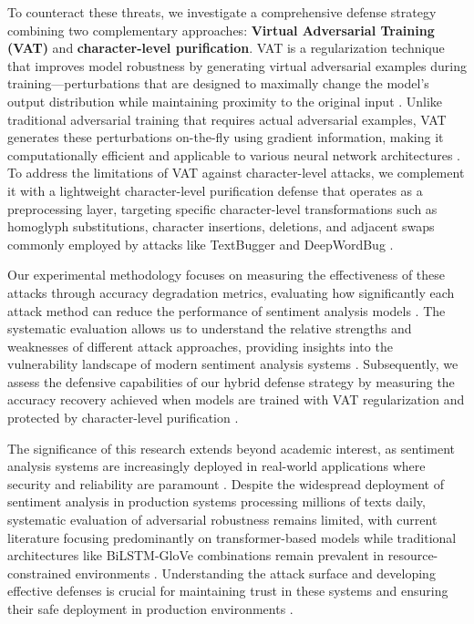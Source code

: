 \documentclass[../main.tex]{subfiles}
\begin{document}
To counteract these threats, we investigate a comprehensive defense strategy combining two complementary approaches: \textbf{Virtual Adversarial Training (VAT)} \cite{miyato2017virtual} and \textbf{character-level purification}. VAT is a regularization technique that improves model robustness by generating virtual adversarial examples during training—perturbations that are designed to maximally change the model's output distribution while maintaining proximity to the original input \cite{miyato2017virtual}. Unlike traditional adversarial training that requires actual adversarial examples, VAT generates these perturbations on-the-fly using gradient information, making it computationally efficient and applicable to various neural network architectures \cite{miyato2017virtual}. To address the limitations of VAT against character-level attacks, we complement it with a lightweight character-level purification defense that operates as a preprocessing layer, targeting specific character-level transformations such as homoglyph substitutions, character insertions, deletions, and adjacent swaps commonly employed by attacks like TextBugger and DeepWordBug \cite{morris2020textattack}.

Our experimental methodology focuses on measuring the effectiveness of these attacks through accuracy degradation metrics, evaluating how significantly each attack method can reduce the performance of sentiment analysis models \cite{jin2019textfooler}. The systematic evaluation allows us to understand the relative strengths and weaknesses of different attack approaches, providing insights into the vulnerability landscape of modern sentiment analysis systems \cite{li2018textbugger}. Subsequently, we assess the defensive capabilities of our hybrid defense strategy by measuring the accuracy recovery achieved when models are trained with VAT regularization and protected by character-level purification \cite{miyato2017virtual}.

The significance of this research extends beyond academic interest, as sentiment analysis systems are increasingly deployed in real-world applications where security and reliability are paramount \cite{morris2020textattack}. Despite the widespread deployment of sentiment analysis in production systems processing millions of texts daily, systematic evaluation of adversarial robustness remains limited, with current literature focusing predominantly on transformer-based models while traditional architectures like BiLSTM-GloVe combinations remain prevalent in resource-constrained environments \cite{belmoukadam2023adversnlp}. Understanding the attack surface and developing effective defenses is crucial for maintaining trust in these systems and ensuring their safe deployment in production environments \cite{jin2019textfooler}. 
\end{document}
